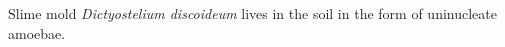 \noindent Slime mold \textsl{Dictyostelium discoideum} lives in the soil in the form of uninucleate amoebae.